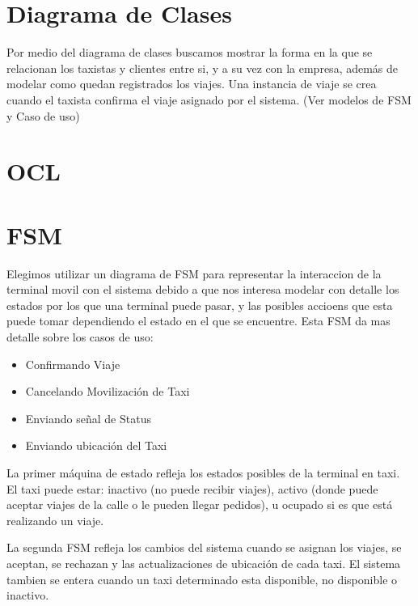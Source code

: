\documentclass[a4paper]{article}
\begin{document}
\section{Diagrama de Clases}
Por medio del diagrama de clases buscamos mostrar la forma en la que se relacionan los taxistas y clientes entre si, y a su vez con la empresa, adem\'as
de modelar como quedan registrados los viajes. Una instancia de viaje se crea cuando el taxista confirma el viaje asignado por el sistema. (Ver modelos de FSM y Caso de uso)


\section{OCL}

\section{FSM}

Elegimos utilizar un diagrama de FSM para representar la interaccion de la terminal movil con el sistema debido a que nos interesa modelar
con detalle los estados por los que una terminal puede pasar, y las posibles accioens que esta puede tomar dependiendo el estado en el que se encuentre.
Esta FSM da mas detalle sobre los casos de uso: 
\begin{itemize}
\item Confirmando Viaje
\item Cancelando Movilizaci\'on de Taxi
\item Enviando se\~nal de Status
\item Enviando ubicaci\'on del Taxi
\end{itemize}

La primer m\'aquina de estado refleja los estados posibles de la terminal en taxi. El taxi
puede estar: inactivo (no puede recibir viajes), activo (donde puede aceptar viajes de la calle o le pueden llegar pedidos), 
u ocupado si es que est\'a realizando un viaje.

La segunda FSM refleja los cambios del sistema cuando se asignan los viajes, se aceptan, se rechazan y las actualizaciones de ubicaci\'on de cada
taxi. El sistema tambien se entera cuando un taxi determinado esta disponible, no disponible o inactivo.
\end{document}
